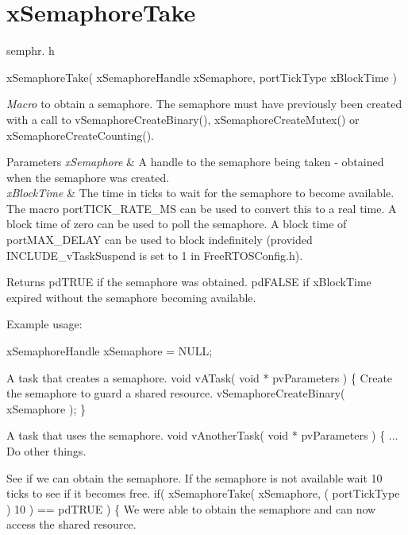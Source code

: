 \hypertarget{group__x_semaphore_take}{\section{x\-Semaphore\-Take}
\label{group__x_semaphore_take}
}
semphr. h 
\begin{DoxyPre}xSemaphoreTake( 
                     xSemaphoreHandle xSemaphore, 
                     portTickType xBlockTime 
                 )\end{DoxyPre}


{\itshape Macro} to obtain a semaphore. The semaphore must have previously been created with a call to v\-Semaphore\-Create\-Binary(), x\-Semaphore\-Create\-Mutex() or x\-Semaphore\-Create\-Counting().


\begin{DoxyParams}{Parameters}
{\em x\-Semaphore} & A handle to the semaphore being taken -\/ obtained when the semaphore was created.\\
\hline
{\em x\-Block\-Time} & The time in ticks to wait for the semaphore to become available. The macro port\-T\-I\-C\-K\-\_\-\-R\-A\-T\-E\-\_\-\-M\-S can be used to convert this to a real time. A block time of zero can be used to poll the semaphore. A block time of port\-M\-A\-X\-\_\-\-D\-E\-L\-A\-Y can be used to block indefinitely (provided I\-N\-C\-L\-U\-D\-E\-\_\-v\-Task\-Suspend is set to 1 in Free\-R\-T\-O\-S\-Config.\-h).\\
\hline
\end{DoxyParams}
\begin{DoxyReturn}{Returns}
pd\-T\-R\-U\-E if the semaphore was obtained. pd\-F\-A\-L\-S\-E if x\-Block\-Time expired without the semaphore becoming available.
\end{DoxyReturn}
Example usage\-: 
\begin{DoxyPre}
 xSemaphoreHandle xSemaphore = NULL;\end{DoxyPre}



\begin{DoxyPre}A task that creates a semaphore.
 void vATask( void * pvParameters )
 \{
Create the semaphore to guard a shared resource.
    vSemaphoreCreateBinary( xSemaphore );
 \}\end{DoxyPre}



\begin{DoxyPre}A task that uses the semaphore.
 void vAnotherTask( void * pvParameters )
 \{
... Do other things.
\begin{DoxyVerb}if( xSemaphore != NULL )
{
\end{DoxyVerb}

See if we can obtain the semaphore.  If the semaphore is not available
wait 10 ticks to see if it becomes free.        
        if( xSemaphoreTake( xSemaphore, ( portTickType ) 10 ) == pdTRUE )
        \{
We were able to obtain the semaphore and can now access the
shared resource.\end{DoxyPre}




